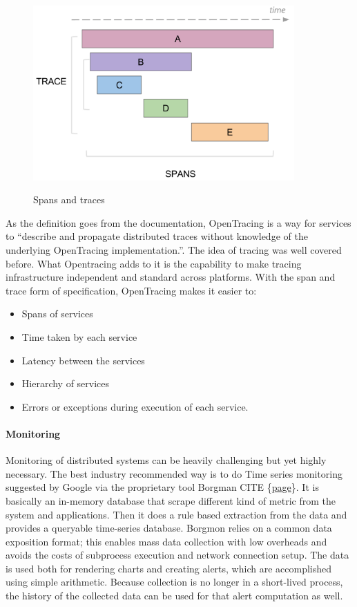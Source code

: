 \documentclass[12pt,titlepage]{article}
\begin{document}
\begin{figure}[!h]
    \caption{Spans and traces}
    \centering
    \includegraphics[width=100mm]{./thesis_images/traces.png}
    \label{fig:traces}
\end{figure}

As the definition goes from the documentation, OpenTracing is a way for services
to “describe and propagate distributed traces without knowledge of the
underlying OpenTracing implementation.”. The idea of tracing was well covered
before. What Opentracing adds to it is the capability to make tracing
infrastructure independent and standard across platforms. With the span and
trace form of specification, OpenTracing makes it easier to:
\begin{itemize}
\item Spans of services
\item Time taken by each service
\item Latency between the services
\item Hierarchy of services
\item Errors or exceptions during execution of each service.
\end{itemize}
\paragraph{Monitoring}
\label{sec:org564d1e9}
Monitoring of distributed systems can be heavily challenging but yet highly
necessary. The best industry recommended way is to do Time series monitoring
suggested by Google via the proprietary tool Borgman CITE \{\href{https://landing.google.com/sre/sre-book/chapters/practical-alerting/}{page}\}. It
is basically an in-memory database that scrape different kind of metric from
the system and applications. Then it does a rule based extraction from the data
and provides a queryable time-series database. Borgmon relies on a common data
exposition format; this enables mass data collection with low overheads and
avoids the costs of subprocess execution and network connection setup. The data
is used both for rendering charts and creating alerts, which are accomplished
using simple arithmetic. Because collection is no longer in a short-lived
process, the history of the collected data can be used for that alert
computation as well.
\end{document}

